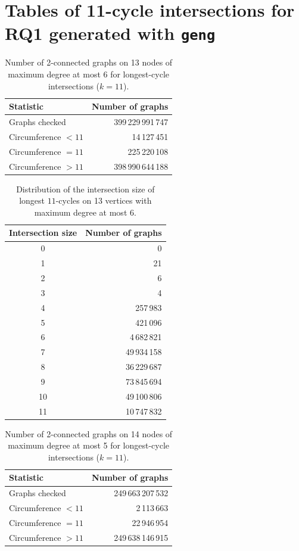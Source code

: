 \chapter{Tables of 11-cycle intersections for RQ1 generated with \texttt{geng}}
\label{app:A}

\begin{table}[ht]
\centering
\caption{Number of 2-connected graphs on 13 nodes of maximum degree at most 6 for longest-cycle intersections ($k=11$).}
\label{tab:summary-geng-2con-n13}
\begin{tabular}{lr}
\toprule
Statistic & Number of graphs \\
\midrule
Graphs checked & 399\,229\,991\,747 \\
Circumference $<11$ & 14\,127\,451 \\
Circumference $=11$ & 225\,220\,108 \\
Circumference $>11$ & 398\,990\,644\,188 \\
\bottomrule
\end{tabular}
\end{table}


\begin{table}[ht]
\centering
\caption{Distribution of the intersection size of longest $11$-cycles on 13 vertices with maximum degree at most 6.}
\label{tab:intersection-d13d6}
\begin{tabular}{cr}
\toprule
Intersection size & Number of graphs \\
\midrule
0 & 0 \\
1 & 21 \\
2 & 6 \\
3 & 4 \\
4 & 257\,983 \\
5 & 421\,096 \\
6 & 4\,682\,821 \\
7 & 49\,934\,158 \\
8 & 36\,229\,687 \\
9 & 73\,845\,694 \\
10 & 49\,100\,806 \\
11 & 10\,747\,832 \\
\bottomrule
\end{tabular}
\end{table}

\begin{table}[ht]
\centering
\caption{Number of 2-connected graphs on 14 nodes of maximum degree at most 5 for longest-cycle intersections ($k=11$).}
\label{tab:summary-geng-2con-n14}
\begin{tabular}{lr}
\toprule
Statistic & Number of graphs \\
\midrule
Graphs checked & 249\,663\,207\,532 \\
Circumference $<11$ & 2\,113\,663 \\
Circumference $=11$ & 22\,946\,954 \\
Circumference $>11$ & 249\,638\,146\,915 \\
\bottomrule
\end{tabular}
\end{table}


